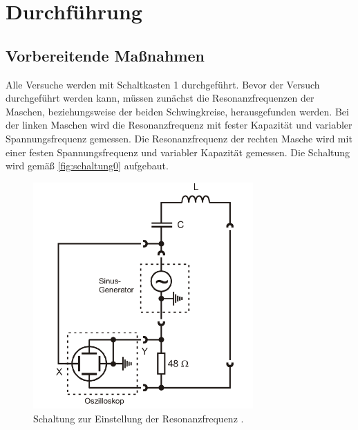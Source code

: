 \section{Durchführung}
\label{sec:Durchführung}

\subsection{Vorbereitende Maßnahmen}
Alle Versuche werden mit Schaltkasten 1 durchgeführt.
Bevor der Versuch durchgeführt werden kann, müssen zunächst die Resonanzfrequenzen der Maschen, beziehungsweise der beiden Schwingkreise,
herausgefunden werden.
Bei der linken Maschen wird die Resonanzfrequenz mit fester Kapazität und variabler Spannungsfrequenz %
gemessen. Die Resonanzfrequenz der rechten Masche wird mit einer festen Spannungsfrequenz und variabler Kapazität  gemessen.
Die Schaltung wird gemäß \autoref{fig:schaltung0} aufgebaut.
\begin{figure}[H]
    \centering
    \includegraphics[width=0.75\textwidth]{plots/Schaltung0.png}
    \caption{Schaltung zur Einstellung der Resonanzfrequenz \cite{Versuchsanleitung}.}
    \label{fig:schaltung0}
\end{figure}

